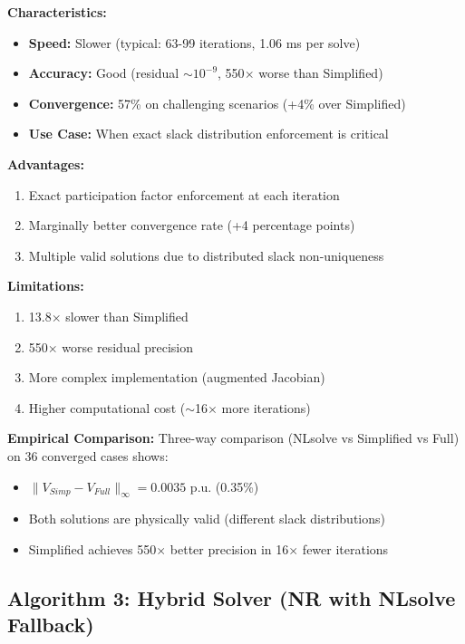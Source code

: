 \documentclass[11pt]{article}
\begin{document}
\textbf{Characteristics:}
\begin{itemize}
    \item \textbf{Speed:} Slower (typical: 63-99 iterations, 1.06 ms per solve)
    \item \textbf{Accuracy:} Good (residual $\sim 10^{-9}$, 550$\times$ worse than Simplified)
    \item \textbf{Convergence:} 57\% on challenging scenarios (+4\% over Simplified)
    \item \textbf{Use Case:} When exact slack distribution enforcement is critical
\end{itemize}

\textbf{Advantages:}
\begin{enumerate}
    \item Exact participation factor enforcement at each iteration
    \item Marginally better convergence rate (+4 percentage points)
    \item Multiple valid solutions due to distributed slack non-uniqueness
\end{enumerate}

\textbf{Limitations:}
\begin{enumerate}
    \item 13.8$\times$ slower than Simplified
    \item 550$\times$ worse residual precision
    \item More complex implementation (augmented Jacobian)
    \item Higher computational cost ($\sim$16$\times$ more iterations)
\end{enumerate}

\textbf{Empirical Comparison:}
Three-way comparison (NLsolve vs Simplified vs Full) on 36 converged cases shows:
\begin{itemize}
    \item $\|V_{Simp} - V_{Full}\|_{\infty} = 0.0035$ p.u. (0.35\%)
    \item Both solutions are physically valid (different slack distributions)
    \item Simplified achieves 550$\times$ better precision in 16$\times$ fewer iterations
\end{itemize}

\subsection{Algorithm 3: Hybrid Solver (NR with NLsolve Fallback)}
\end{document}

